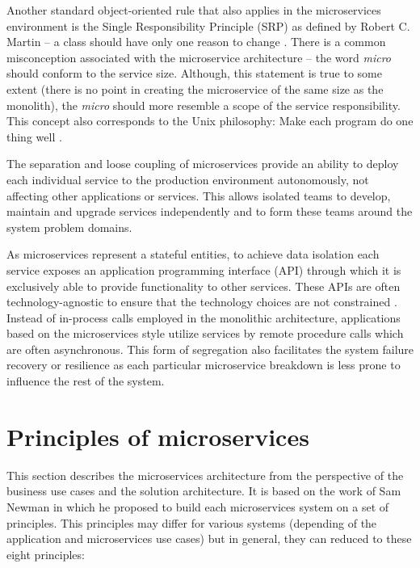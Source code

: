\documentclass[oneside,
  digital, %
  table,   %
  nolof,     %
  nolot,     %
]{fithesis3}
\begin{document}
Another standard object-oriented rule that also applies in the microservices environment is the Single Responsibility Principle (SRP) as defined by Robert C. Martin -- a class should have only one reason to change \cite{agile_ppp_c}. There is a common misconception associated with the microservice architecture -- the word \textit{micro} should conform to the service size. Although, this statement is true to some extent (there is no point in creating the microservice of the same size  as the monolith), the \textit{micro} should more resemble a scope of the service responsibility. This concept also corresponds to the Unix philosophy: Make each program do one thing well \cite{unix_time_sharing_foreword}.

The separation and loose coupling of microservices provide an ability to deploy each individual service to the production environment autonomously, not affecting other applications or services. This allows isolated teams to develop, maintain and upgrade services independently and to form these teams around the system problem domains. 

As microservices represent a stateful entities, to achieve data isolation each service exposes an application programming interface (API) through which it is exclusively able to provide functionality to other services. These APIs are often technology-agnostic to ensure that the technology choices are not constrained \cite{building_ms}. Instead of in-process calls employed in the monolithic architecture, applications based on the microservices style utilize services by remote procedure calls which are often asynchronous. This form of segregation also facilitates the system failure recovery or resilience as each particular microservice breakdown is less prone to influence the rest of the system.

\section{Principles of microservices}

This section describes the microservices architecture from the perspective of the business use cases and the solution architecture. It is based on the work of Sam Newman \cite{building_ms, principles_of_microservices} in which he proposed to build each microservices system on a set of principles. This principles may differ for various systems (depending of the application and microservices use cases) but in general, they can reduced to these eight principles:
\end{document}
